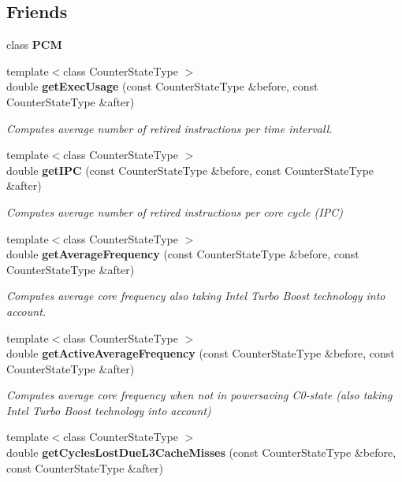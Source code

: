 \subsection*{Friends}
\begin{DoxyCompactItemize}
\item 
class {\bfseries P\+C\+M}\label{classBasicCounterState_ab5f56d2e95ba3daf52c17b8a1d356d64}

\item 
{\footnotesize template$<$class Counter\+State\+Type $>$ }\\double {\bf get\+Exec\+Usage} (const Counter\+State\+Type \&before, const Counter\+State\+Type \&after)
\begin{DoxyCompactList}\small\item\em Computes average number of retired instructions per time intervall. \end{DoxyCompactList}\item 
{\footnotesize template$<$class Counter\+State\+Type $>$ }\\double {\bf get\+I\+P\+C} (const Counter\+State\+Type \&before, const Counter\+State\+Type \&after)
\begin{DoxyCompactList}\small\item\em Computes average number of retired instructions per core cycle (I\+P\+C) \end{DoxyCompactList}\item 
{\footnotesize template$<$class Counter\+State\+Type $>$ }\\double {\bf get\+Average\+Frequency} (const Counter\+State\+Type \&before, const Counter\+State\+Type \&after)
\begin{DoxyCompactList}\small\item\em Computes average core frequency also taking Intel Turbo Boost technology into account. \end{DoxyCompactList}\item 
{\footnotesize template$<$class Counter\+State\+Type $>$ }\\double {\bf get\+Active\+Average\+Frequency} (const Counter\+State\+Type \&before, const Counter\+State\+Type \&after)
\begin{DoxyCompactList}\small\item\em Computes average core frequency when not in powersaving C0-\/state (also taking Intel Turbo Boost technology into account) \end{DoxyCompactList}\item 
{\footnotesize template$<$class Counter\+State\+Type $>$ }\\double {\bf get\+Cycles\+Lost\+Due\+L3\+Cache\+Misses} (const Counter\+State\+Type \&before, const Counter\+State\+Type \&after)

\end{DoxyCompactItemize}
